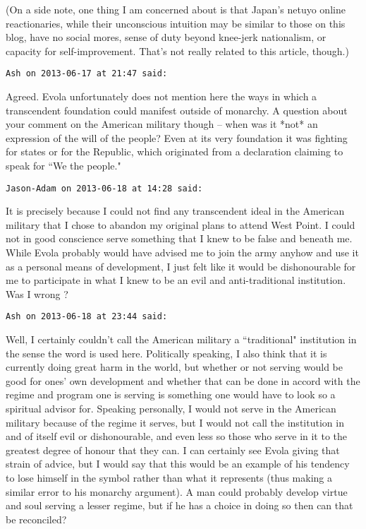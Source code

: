 \begin{footnotesize}
\begin{sffamily}
(On a side note, one thing I am concerned about is that Japan's netuyo online reactionaries, while their unconscious intuition may be similar to those on this blog, have no social mores, sense of duty beyond knee-jerk nationalism, or capacity for self-improvement. That's not really related to this article, though.)

\hfill

\texttt{Ash on 2013-06-17 at 21:47 said: }

Agreed. Evola unfortunately does not mention here the ways in which a transcendent foundation could manifest outside of monarchy. A question about your comment on the American military though – when was it *not* an expression of the will of the people? Even at its very foundation it was fighting for states or for the Republic, which originated from a declaration claiming to speak for ``We the people."


\hfill

\texttt{Jason-Adam on 2013-06-18 at 14:28 said: }

It is precisely because I could not find any transcendent ideal in the American military that I chose to abandon my original plans to attend West Point. I could not in good conscience serve something that I knew to be false and beneath me. While Evola probably would have advised me to join the army anyhow and use it as a personal means of development, I just felt like it would be dishonourable for me to participate in what I knew to be an evil and anti-traditional institution. Was I wrong ?


\hfill

\texttt{Ash on 2013-06-18 at 23:44 said: }

Well, I certainly couldn't call the American military a ``traditional" institution in the sense the word is used here. Politically speaking, I also think that it is currently doing great harm in the world, but whether or not serving would be good for ones' own development and whether that can be done in accord with the regime and program one is serving is something one would have to look so a spiritual advisor for. Speaking personally, I would not serve in the American military because of the regime it serves, but I would not call the institution in and of itself evil or dishonourable, and even less so those who serve in it to the greatest degree of honour that they can. I can certainly see Evola giving that strain of advice, but I would say that this would be an example of his tendency to lose himself in the symbol rather than what it represents (thus making a similar error to his monarchy argument). A man could probably develop virtue and soul serving a lesser regime, but if he has a choice in doing so then can that be reconciled?



\end{sffamily}
\end{footnotesize}
